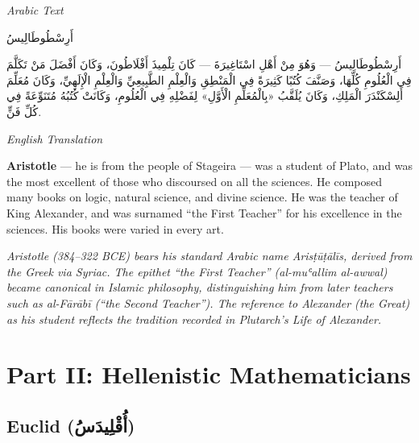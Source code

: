 \documentclass[11pt,a4paper]{article}
\def\RL#1{\beginR#1\endR}
\newcommand{\cnote}[1]{\textcolor{notecolor}{\textit{#1}}}
\newcommand{\textarabic}[1]{{\arabicfont\RL{#1}}}
\newenvironment{arabiccol}{%
  \begin{minipage}[t]{0.48\textwidth}%
  \begin{tcolorbox}[colback=leftbg,colframe=rulecolor,boxrule=0.4pt,arc=2pt,left=5pt,right=5pt,top=5pt,bottom=5pt]%
  \centering\textit{\footnotesize Arabic Text}\\[0.4em]%
  \raggedright\arabicfont\small%
}{%
  \end{tcolorbox}%
  \end{minipage}%
}
\newenvironment{englishcol}{%
  \begin{minipage}[t]{0.48\textwidth}%
  \begin{tcolorbox}[colback=rightbg,colframe=rulecolor,boxrule=0.4pt,arc=2pt,left=5pt,right=5pt,top=5pt,bottom=5pt]%
  \centering\textit{\footnotesize English Translation}\\[0.4em]%
  \raggedright\small%
}{%
  \end{tcolorbox}%
  \end{minipage}%
}
\begin{document}
\noindent
\begin{arabiccol}
\beginR
أَرِسْطُوطَالِيسُ

أَرِسْطُوطَالِيسُ — وَهُوَ مِنْ أَهْلِ اسْتَاغِيرَةَ — كَانَ تِلْمِيذَ أَفْلَاطُونَ، وَكَانَ أَفْضَلَ مَنْ تَكَلَّمَ فِي الْعُلُومِ كُلِّهَا، وَصَنَّفَ كُتُبًا كَثِيرَةً فِي الْمَنْطِقِ وَالْعِلْمِ الطَّبِيعِيِّ وَالْعِلْمِ الْإِلَهِيِّ، وَكَانَ مُعَلِّمَ أَلِسْكَنْدَرَ الْمَلِكِ، وَكَانَ يُلَقَّبُ «بِالْمُعَلِّمِ الْأَوَّلِ» لِفَضْلِهِ فِي الْعُلُومِ، وَكَانَتْ كُتُبُهُ مُتَنَوِّعَةً فِي كُلِّ فَنٍّ.
\endR
\end{arabiccol}
\hfill
\begin{englishcol}
\textbf{Aristotle} --- he is from the people of Stageira --- was a student of Plato, and was the most excellent of those who discoursed on all the sciences. He composed many books on logic, natural science, and divine science. He was the teacher of King Alexander, and was surnamed ``the First Teacher'' for his excellence in the sciences. His books were varied in every art.

\cnote{Aristotle (384--322 BCE) bears his standard Arabic name \textit{Arisṭūṭālīs}, derived from the Greek via Syriac. The epithet ``the First Teacher'' (\textit{al-muʿallim al-awwal}) became canonical in Islamic philosophy, distinguishing him from later teachers such as al-Fārābī (``the Second Teacher''). The reference to Alexander (the Great) as his student reflects the tradition recorded in Plutarch's \textit{Life of Alexander}.}
\end{englishcol}

\par\vspace{0.5em}

\newpage

\section{Part II: Hellenistic Mathematicians}
\label{sec:hellenistic}

\subsection{Euclid (\textarabic{أُقْلِيدَسُ})}
\end{document}
